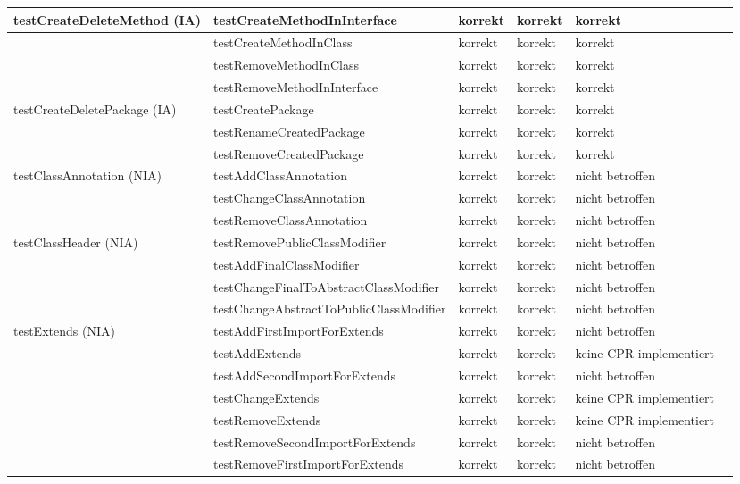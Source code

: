 \begin{tiny}
\begin{longtable}[c]{|p{2.2cm}|p{3.5cm}|p{1cm}|p{1cm}|p{1cm}|p{4cm}|}
testCreateDeleteMethod 			(IA) & testCreateMethodInInterface & korrekt & korrekt & korrekt &  \\ \hline
 & testCreateMethodInClass & korrekt & korrekt & korrekt &  \\ \hline
 & testRemoveMethodInClass & korrekt & korrekt & korrekt &  \\ \hline
 & testRemoveMethodInInterface & korrekt & korrekt & korrekt &  \\ \hline
testCreateDeletePackage 			(IA) & testCreatePackage & korrekt & korrekt & korrekt &  \\ \hline
 & testRenameCreatedPackage & korrekt & korrekt & korrekt &  \\ \hline
 & testRemoveCreatedPackage & korrekt & korrekt & korrekt &  \\ \hline
testClassAnnotation 			(NIA) & testAddClassAnnotation & korrekt & korrekt & nicht 			betroffen &  \\ \hline
 & testChangeClassAnnotation & korrekt & korrekt & nicht 			betroffen &  \\ \hline
 & testRemoveClassAnnotation & korrekt & korrekt & nicht 			betroffen &  \\ \hline
testClassHeader 			(NIA) & testRemovePublicClassModifier & korrekt & korrekt & nicht 			betroffen &  \\ \hline
 & testAddFinalClassModifier & korrekt & korrekt & nicht 			betroffen &  \\ \hline
 & testChangeFinalToAbstractClassModifier & korrekt & korrekt & nicht 			betroffen &  \\ \hline
 & testChangeAbstractToPublicClassModifier & korrekt & korrekt & nicht 			betroffen &  \\ \hline
testExtends 			(NIA) & testAddFirstImportForExtends & korrekt & korrekt & nicht 			betroffen &  \\ \hline
 & testAddExtends & korrekt & korrekt & keine 			CPR implementiert &  \\ \hline
 & testAddSecondImportForExtends & korrekt & korrekt & nicht 			betroffen &  \\ \hline
 & testChangeExtends & korrekt & korrekt & keine 			CPR implementiert &  \\ \hline
 & testRemoveExtends & korrekt & korrekt & keine 			CPR implementiert &  \\ \hline
 & testRemoveSecondImportForExtends & korrekt & korrekt & nicht 			betroffen &  \\ \hline
 & testRemoveFirstImportForExtends & korrekt & korrekt & nicht 			betroffen &  \\ \hline

\end{longtable}
\end{tiny}
